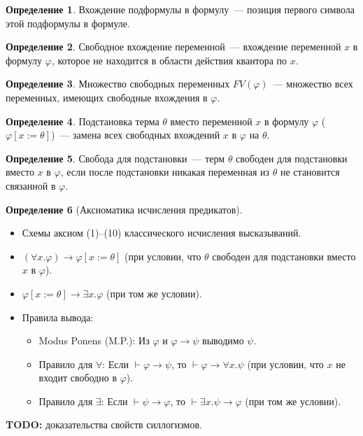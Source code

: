 \documentclass[a4paper,11pt]{article}
\theoremstyle{definition}
\newtheorem*{dfn}{Определение}
\newcommand{\proves}{\vdash}
\newcommand{\todo}[1]{\textbf{TODO:} #1}
\begin{document}
\begin{dfn}
Вхождение подформулы в формулу~--- позиция первого символа этой подформулы в
формуле.
\end{dfn}
\begin{dfn}
Свободное вхождение переменной~--- вхождение переменной $x$ в формулу $\varphi$,
которое не находится в области действия квантора по $x$.
\end{dfn}
\begin{dfn}
Множество свободных переменных $FV(\varphi)$~--- множество всех переменных,
имеющих свободные вхождения в $\varphi$.
\end{dfn}
\begin{dfn}
Подстановка терма $\theta$ вместо переменной $x$ в формулу $\varphi$
($\varphi[x := \theta]$)~--- замена всех свободных вхождений $x$ в $\varphi$ на
$\theta$.
\end{dfn}
\begin{dfn}
Свобода для подстановки~--- терм $\theta$ свободен для подстановки вместо $x$ в
$\varphi$, если после подстановки никакая переменная из $\theta$ не становится
связанной в $\varphi$.
\end{dfn}
\begin{dfn}[Аксиоматика исчисления предикатов]
\begin{itemize}
\item Схемы аксиом (1)--(10) классического исчисления высказываний.
\item $(\forall x.\varphi) \to \varphi[x := \theta]$ (при условии, что $\theta$
  свободен для подстановки вместо $x$ в $\varphi$).
\item $\varphi[x := \theta] \to \exists x.\varphi$ (при том же условии).
\item Правила вывода:
  \begin{itemize}
  \item Modus Ponens (M.P.): Из $\varphi$ и $\varphi \to \psi$ выводимо $\psi$.
  \item Правило для $\forall$: Если $\proves \varphi \to \psi$, то $\proves
    \varphi \to \forall x.\psi$ (при условии, что $x$ не входит свободно в
    $\varphi$).
  \item Правило для $\exists$: Если $\proves \psi \to \varphi$, то $\proves
    \exists x.\psi \to \varphi$ (при том же условии).
  \end{itemize}
\end{itemize}
\end{dfn}
\todo{доказательства свойств силлогизмов.}
\end{document}
